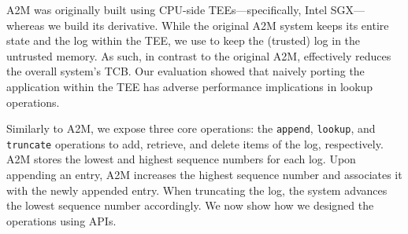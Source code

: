A2M was originally built using CPU-side TEEs---specifically, Intel SGX--- whereas we build its \projecttitle{} derivative. While the original A2M system keeps its entire state and the log within the TEE, we use \projecttitle{} to keep the (trusted) log in the untrusted memory. As such, in contrast to the original A2M, \projecttitle{} effectively reduces the overall system's TCB. Our evaluation showed that naively porting the application within the TEE has adverse performance implications in lookup operations.



 Similarly to A2M, we expose three core operations: the \texttt{append}, \texttt{lookup}, and \texttt{truncate} operations to add, retrieve, and delete items of the log, respectively. A2M stores the lowest and highest sequence numbers for each log. Upon appending an entry, A2M increases the highest sequence number and associates it with the newly appended entry. When truncating the log, the system advances the lowest sequence number accordingly. We now show how we designed the operations using \projecttitle{} APIs.




